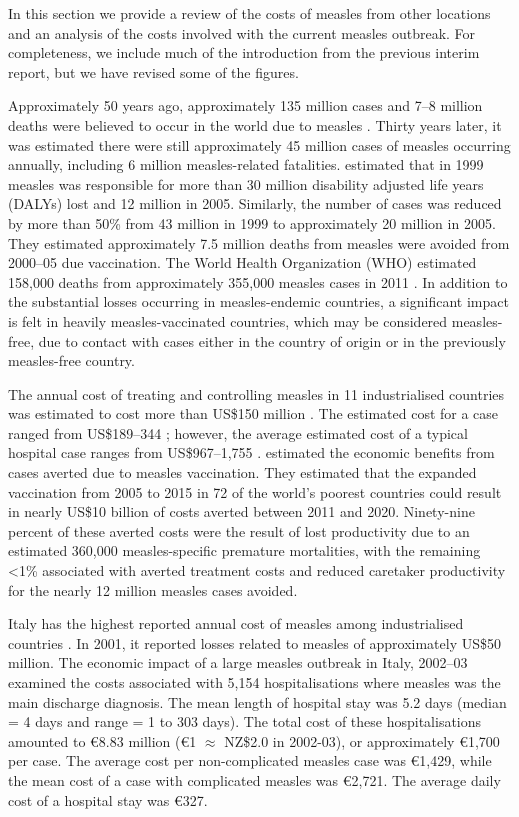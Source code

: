 \documentclass{article}
\begin{document}
In this section we provide a review of the costs of measles from other locations and an analysis of the costs involved with the current measles outbreak. For completeness, we include much of the introduction from the previous interim report, but we have revised some of the figures.

Approximately 50 years ago, approximately 135 million cases and 7--8 million deaths were believed to occur in the world due to measles \citep{clements4}. Thirty years later, it was estimated there were still approximately 45 million cases of measles occurring annually, including 6 million measles-related fatalities. \citep{wolfson7} estimated that in 1999 measles was responsible for more than 30 million disability adjusted life years (DALYs) lost and 12 million in 2005. Similarly, the number of cases was reduced by more than 50\% from 43 million in 1999 to approximately 20 million in 2005. They estimated approximately 7.5 million deaths from measles were avoided from 2000--05 due vaccination. The World Health Organization (WHO) estimated 158,000 deaths from approximately 355,000 measles cases in 2011 \citep{who13}.  In addition to the substantial losses occurring in measles-endemic countries, a significant impact is felt in heavily measles-vaccinated countries, which may be considered measles-free, due to contact with cases either in the country of origin or in the previously measles-free country.

The annual cost of treating and controlling measles in 11 industrialised countries was estimated to cost more than US\$150 million \citep{carabin3}. The estimated cost for a case ranged from US\$189--344 \citep{carabin3}; however, the average estimated cost of a typical hospital case ranges from US\$967--1,755 \citep{carabin2}. \citep{stack11} estimated the economic benefits from cases averted due to measles vaccination. They estimated that the expanded vaccination from 2005 to 2015 in 72 of the world's poorest countries could result in nearly US\$10 billion of costs averted between 2011 and 2020. Ninety-nine percent of these averted costs were the result of lost productivity due to an estimated 360,000 measles-specific premature mortalities, with the remaining <1\% associated with averted treatment costs and reduced caretaker productivity for the nearly 12 million measles cases avoided.

Italy has the highest reported annual cost of measles among industrialised countries \citep{carabin3}. In 2001, it reported losses related to measles of approximately US\$50 million. The economic impact of a large measles outbreak in Italy, 2002--03 examined the costs associated with 5,154 hospitalisations where measles was the main discharge diagnosis. The mean length of hospital stay was 5.2 days (median = 4 days and range = 1 to 303 days). The total cost of these hospitalisations amounted to \euro 8.83 million (\euro 1 $\approx$ NZ\$2.0 in 2002-03), or approximately \euro 1,700 per case. The average cost per non-complicated measles case was  \euro 1,429, while the mean cost of a case with complicated measles was  \euro 2,721. The average daily cost of a hospital stay was  \euro 327.
\end{document}
